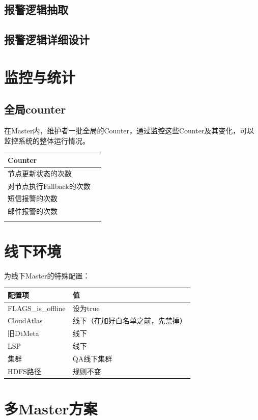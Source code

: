 \documentclass[11pt]{article}
\begin{document}
\subsection{报警逻辑抽取}
\label{sec-5-6}
\subsection{报警逻辑详细设计}
\label{sec-5-7}

\section{监控与统计}
\label{sec-6}
\subsection{全局counter}
\label{sec-6-1}
在Master内，维护者一批全局的Counter，通过监控这些Counter及其变化，可以监控系统的整体运行情况。

\begin{center}
\begin{tabular}{ll}
Counter & \\
\hline
节点更新状态的次数 & \\
对节点执行Fallback的次数 & \\
短信报警的次数 & \\
邮件报警的次数 & \\
 & \\
\end{tabular}
\end{center}
\section{线下环境}
\label{sec-7}
为线下Master的特殊配置：
\begin{center}
\begin{tabular}{ll}
配置项 & 值\\
\hline
FLAGS\_is\_offline & 设为true\\
CloudAtlas & 线下（在加好白名单之前，先禁掉）\\
旧DtMeta & 线下\\
LSP & 线下\\
集群 & QA线下集群\\
HDFS路径 & 规则不变\\
\end{tabular}
\end{center}
\section{多Master方案}
\label{sec-8}
\end{document}
